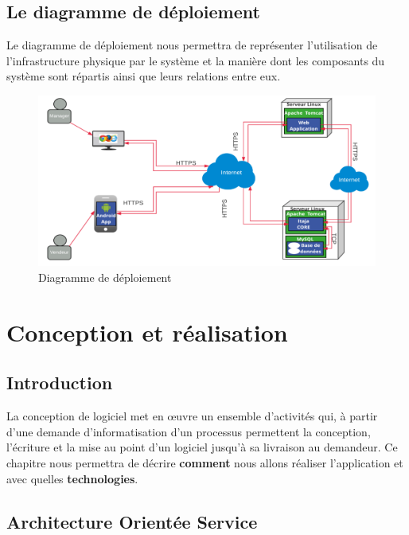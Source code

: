 \documentclass[12pt]{report}
\begin{document}
      \section{Le diagramme de déploiement}
      Le diagramme de déploiement nous permettra de représenter l'utilisation de l'infrastructure physique par le système et la manière dont les composants du système sont répartis ainsi que leurs relations entre eux.
      
	\begin{figure}[H]
		\begin{center}
		  \includegraphics[scale=0.3]{images/diagrammeDeployement.png}
		  \caption{Diagramme de déploiement}
		\end{center}
	  \end{figure}

    \chapter{Conception et réalisation}
      \section{Introduction}
	La conception de logiciel met en œuvre un ensemble d'activités qui, à partir d'une demande d'informatisation d'un processus permettent la conception, l'écriture et la mise au point d'un logiciel jusqu'à sa livraison au demandeur. Ce chapitre nous permettra de décrire \textbf{comment} nous allons réaliser l'application et avec quelles \textbf{technologies}.
	
      \section{Architecture Orientée Service}
\end{document}

